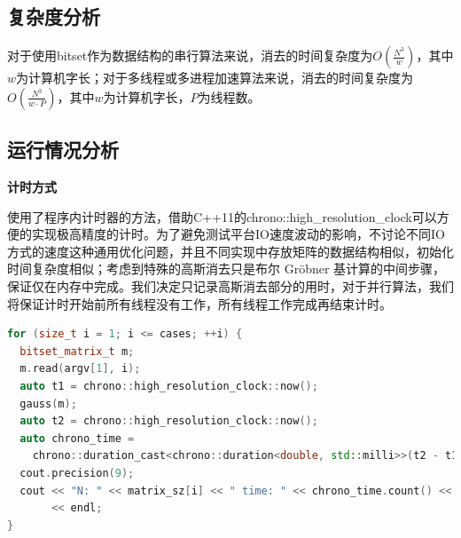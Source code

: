 \documentclass[a4paper]{article}
\begin{document}
\subsection{复杂度分析}
对于使用bitset作为数据结构的串行算法来说，消去的时间复杂度为$O(\frac{N^3}{w})$，其中$w$为计算机字长；对于多线程或多进程加速算法来说，消去的时间复杂度为$O(\frac{N^3}{w \cdot P})$，其中$w$为计算机字长，$P$为线程数。

\subsection{运行情况分析}
\textbf{计时方式}

使用了程序内计时器的方法，借助C++11的chrono::high\_resolution\_clock可以方便的实现极高精度的计时。为了避免测试平台IO速度波动的影响，不讨论不同IO方式的速度这种通用优化问题，并且不同实现中存放矩阵的数据结构相似，初始化时间复杂度相似；考虑到特殊的高斯消去只是布尔 Gröbner 基计算的中间步骤，保证仅在内存中完成。我们决定只记录高斯消去部分的用时，对于并行算法，我们将保证计时开始前所有线程没有工作，所有线程工作完成再结束计时。

\begin{lstlisting}[frame=trbl, language={C++}, caption={计时器参考代码}, label={code:chrono}]
for (size_t i = 1; i <= cases; ++i) {
  bitset_matrix_t m;
  m.read(argv[1], i);
  auto t1 = chrono::high_resolution_clock::now();
  gauss(m);
  auto t2 = chrono::high_resolution_clock::now();
  auto chrono_time =
    chrono::duration_cast<chrono::duration<double, std::milli>>(t2 - t1);
  cout.precision(9);
  cout << "N: " << matrix_sz[i] << " time: " << chrono_time.count() << " ms"
       << endl;
}
\end{lstlisting}
\end{document}
